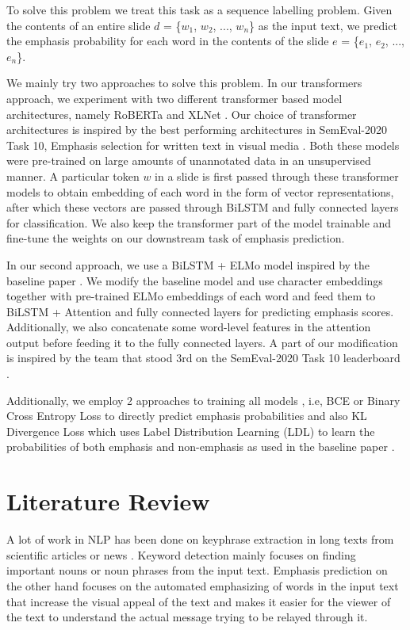 \documentclass[letterpaper]{article}
\begin{document}
To solve this problem we treat this task as a sequence labelling problem. Given the contents of an entire slide $d$ = \{$w_1$, $w_2$, ..., $w_n$\} as the input text, we predict the emphasis probability for each word in the contents of the slide $e$ = \{$e_1$, $e_2$, ..., $e_n$\}.

We mainly try two approaches to solve this problem. In our transformers approach, we experiment with two different transformer based model architectures, namely RoBERTa \citep{liu2019RoBERTa} and XLNet \citep{yang2019XLNet}. Our choice of transformer architectures is inspired by the best performing architectures in SemEval-2020 Task 10, Emphasis selection for written text in visual media \citep{singhal2020iitk,anand2020midas}. Both these models were pre-trained on large amounts of unannotated data in an unsupervised manner. A particular token $w$ in a slide is first passed through these transformer models to obtain  embedding of each word in the form of vector representations, after which these vectors are passed through BiLSTM and fully connected layers for classification. We also keep the transformer part of the model trainable and fine-tune the weights on our downstream task of emphasis prediction.

In our second approach, we use a BiLSTM + ELMo  model inspired by the baseline paper \citep{shirani2019learning}. We modify the baseline model and use character embeddings together with pre-trained ELMo embeddings of each word and feed them to BiLSTM + Attention and fully connected layers for predicting emphasis scores. Additionally, we also concatenate some word-level features in the attention output before feeding it to the fully connected layers. A part of our modification is inspired by the team that stood 3rd on the SemEval-2020  Task  10 leaderboard \citep{singhal2020iitk}.

Additionally, we employ 2 approaches to training all models , i.e, BCE or Binary Cross Entropy Loss to directly predict emphasis probabilities and also KL Divergence Loss \citep{kullback1951information} which uses Label Distribution Learning (LDL) \citep{geng2016label} to learn the probabilities of both emphasis and non-emphasis as used in the baseline paper \citep{shirani2019learning}.

\section{Literature Review}
A lot of work in NLP has been done on keyphrase extraction in long texts from scientific articles or news \citep{augenstein2017semeval,zhang2016keyphrase}. Keyword detection mainly focuses on finding important nouns or noun phrases from the input text. Emphasis prediction on the other hand focuses on the automated emphasizing of words in the input text that increase the visual appeal of the text and makes it easier for the viewer of the text to understand the actual message trying to be relayed through it.
\end{document}
